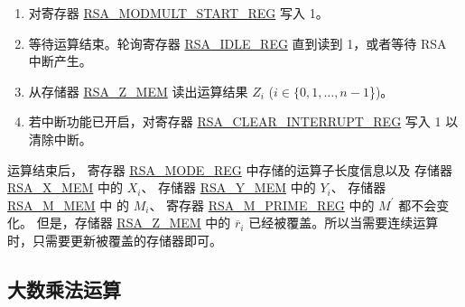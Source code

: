 \documentclass[main\_\_CN.tex]{subfiles}
\begin{document}
\begin{enumerate}
    \item 对寄存器 \hyperref[regdesc:RSAMODMULTSTARTREG]{RSA\_MODMULT\_START\_REG} 写入 1。

    \item 等待运算结束。轮询寄存器 \hyperref[regdesc:RSAIDLEREG]{RSA\_IDLE\_REG} 直到读到 1，或者等待 RSA 中断产生。
    
    \item 从存储器 \hyperref[regdesc:RSAmemory]{RSA\_Z\_MEM} 读出运算结果 \begin{math}Z_{i}\end{math} (\begin{math}i \in \{ 0, 1, \dots, n-1 \end{math}\})。

    \item 若中断功能已开启，对寄存器 \hyperref[regdesc:RSACLEARINTERRUPTREG]{RSA\_CLEAR\_INTERRUPT\_REG} 写入 1 以清除中断。

\end{enumerate}


运算结束后，
寄存器 \hyperref[regdesc:RSAMODEXPMODEREG]{RSA\_MODE\_REG} 中存储的运算子长度信息以及
存储器 \hyperref[regdesc:RSAmemory]{RSA\_X\_MEM} 中的 \begin{math}X_{i}\end{math}、
存储器 \hyperref[regdesc:RSAmemory]{RSA\_Y\_MEM} 中的 \begin{math}Y_{i}\end{math}、
存储器 \hyperref[regdesc:RSAmemory]{RSA\_M\_MEM} 中 的 \begin{math}M_{i}\end{math}、
寄存器 \hyperref[regdesc:RSAMPRIMEREG]{RSA\_M\_PRIME\_REG} 中的 \begin{math}M^{\prime}\end{math} 都不会变化。
但是，存储器 \hyperref[regdesc:RSAmemory]{RSA\_Z\_MEM} 中的 \begin{math}\overline{r}_{i}\end{math} 
已经被覆盖。所以当需要连续运算时，只需要更新被覆盖的存储器即可。


\subsection{大数乘法运算}
\end{document}
